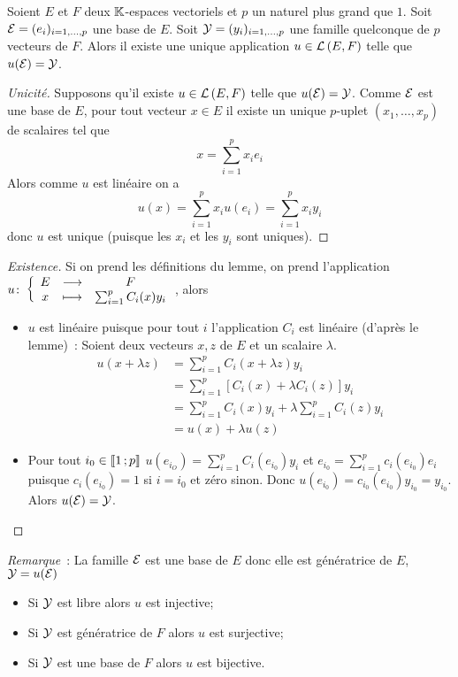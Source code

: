 \begin{theo}\label{theo:caracapplinimagebase}
  Soient $E$ et $F$ deux $\mathbb{K}$-espaces vectoriels et $p$ un naturel plus grand que $1$. Soit $\mathcal{E}=(e_i)_{i=1, \ldots, p}$ une base de $E$. Soit $\mathcal{Y}=(y_i)_{i=1, \ldots, p}$ une famille quelconque de $p$ vecteurs de $F$. Alors il existe une unique application $u \in \mathcal{L}\left(E,F\right)$ telle que $u(\mathcal{E})=\mathcal{Y}$.
\end{theo}
\begin{proof}[Unicité]
  Supposons qu'il existe $u \in \mathcal{L}\left(E,F\right)$ telle que $u(\mathcal{E})=\mathcal{Y}$. Comme $\mathcal{E}$ est une base de $E$, pour tout vecteur $x \in E$ il existe un unique $p$-uplet $(x_1, \ldots, x_p)$ de scalaires tel que
  \begin{equation}
    x = \sum_{i=1}^p x_ie_i
  \end{equation}
  Alors comme $u$ est linéaire on a
  \begin{equation}
    u(x)=\sum_{i=1}^px_i u(e_i) = \sum_{i=1}^px_i y_i
  \end{equation}
  donc $u$ est unique (puisque les $x_i$ et les $y_i$ sont uniques).
\end{proof}
\begin{proof}[Existence]
  Si on prend les définitions du lemme, on prend l'application $u\colon \left\{\begin{array}{ccc} E & \longrightarrow &F\\ x & \longmapsto & \sum_{i=1}^pC_i(x)y_i \end{array} \right.$, alors
  \begin{itemize}
  \item $u$ est linéaire puisque pour tout $i$ l'application $C_i$ est linéaire (d'après le lemme)~: Soient deux vecteurs $x,z$ de $E$ et un scalaire $\lambda$.
    \begin{align}
      u(x+\lambda z)&=\sum_{i=1}^p C_i(x+\lambda z)y_i \\
      &=\sum_{i=1}^p [C_i(x)+\lambda C_i(z)]y_i \\
      &=\sum_{i=1}^p C_i(x) y_i +\lambda \sum_{i=1}^p C_i(z)y_i\\
      &=u(x)+\lambda u(z)
    \end{align}
  \item Pour tout $i_0 \in \mathopen{\llbracket}1\mathclose{}\mathpunct{};p\mathclose{\rrbracket}$ $u(e_{i_O})=\sum_{i=1}^p C_i(e_{i_0}) y_i$ et $e_{i_0}=\sum_{i=1}^pc_i(e_{i_0}) e_i$ puisque $c_i(e_{i_0})=1$ si $i=i_0$ et zéro sinon. Donc $u(e_{i_0})=c_{i_0}(e_{i_0})y_{i_0}=y_{i_0}$. Alors $u(\mathcal{E})=\mathcal{Y}$.
  \end{itemize}
\end{proof}

\emph{Remarque}~: La famille $\mathcal{E}$ est une base de $E$ donc elle est génératrice de $E$, $\mathcal{Y}=u(\mathcal{E})$
\begin{itemize}
\item Si $\mathcal{Y}$ est libre alors $u$ est injective;
\item Si $\mathcal{Y}$ est génératrice de $F$ alors $u$ est surjective;
\item Si $\mathcal{Y}$ est une base de $F$ alors $u$ est bijective.
\end{itemize}

